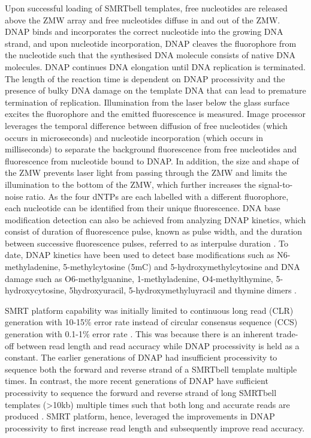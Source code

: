 Upon successful loading of SMRTbell templates, free nucleotides are released above the ZMW array and free nucleotides diffuse in and out of the ZMW. DNAP binds and incorporates the correct nucleotide into the growing DNA strand, and upon nucleotide incorporation, DNAP cleaves the fluorophore from the nucleotide such that the synthesised DNA molecule consists of native DNA molecules. DNAP continues DNA elongation until DNA replication is terminated. The length of the reaction time is dependent on DNAP processivity and the presence of bulky DNA damage on the template DNA that can lead to premature termination of replication\cite{}. Illumination from the laser below the glass surface excites the fluorophore and the emitted fluorescence is measured. Image processor leverages the temporal difference between diffusion of free nucleotides (which occurs in microseconds) and nucleotide incorporation (which occurs in milliseconds) to separate the background fluorescence from free nucleotides and fluorescence from nucleotide bound to DNAP. In addition, the size and shape of the ZMW prevents laser light from passing through the ZMW and limits the illumination to the bottom of the ZMW, which further increases the signal-to-noise ratio. As the four dNTPs are each labelled with a different fluorophore, each nucleotide can be identified from their unique fluorescence\cite{Eid2009-ol}. DNA base modification detection can also be achieved from analyzing DNAP kinetics, which consist of duration of fluorescence pulse, known as pulse width, and the duration between successive fluorescence pulses, referred to as interpulse duration \cite{Flusberg2010-ub}. To date, DNAP kinetics have been used to detect base modifications such as N6-methyladenine, 5-methylcytosine (5mC) and 5-hydroxymethylcytosine \cite{Flusberg2010-ub} and DNA damage such as O6-methylguanine, 1-methyladenine, O4-methylthymine, 5-hydroxycytosine, 5hydroxyuracil, 5-hydroxymethyluyracil and thymine dimers \cite{Clark2011-jz}. 

SMRT platform capability was initially limited to continuous long read (CLR) generation with 10-15\% error rate \cite{Eid2009-ol} instead of circular consensus sequence (CCS) generation with 0.1-1\% error rate \cite{Wenger2019-pw}. This was because there is an inherent trade-off between read length and read accuracy while DNAP processivity is held as a constant. The earlier generations of DNAP had insufficient processivity to sequence both the forward and reverse strand of a SMRTbell template multiple times. In contrast, the more recent generations of DNAP have sufficient processivity to sequence the forward and reverse strand of long SMRTbell templates (>10kb) multiple times such that both long and accurate reads are produced \cite{Wenger2019-pw}. SMRT platform, hence, leveraged the improvements in DNAP processivity to first increase read length and subsequently improve read accuracy. 

